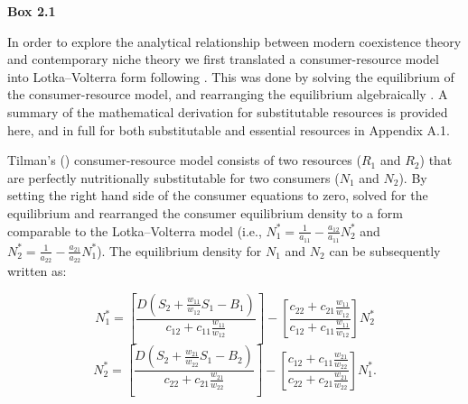 \clearpage 
\begin{flushleft}
\textbf{Box 2.1}
\end{flushleft}
\begin{infobox}
	
In order to explore the analytical relationship between modern coexistence theory \citep{Chesson2000} and contemporary niche theory \citep{Chase2003} we first translated a consumer-resource model into Lotka--Volterra form following \citet[][Ch.~7]{tilman1982}. This was done by solving the equilibrium of the consumer-resource model, and rearranging the equilibrium algebraically \citep[for an alternative approach see][]{Meszenaz2006, Barabas2014}. A summary of the mathematical derivation for substitutable resources is provided here, and in full for both substitutable and essential resources in Appendix A.1.
\par


Tilman's (\citeyear{tilman1982}) consumer-resource model consists of two resources ($R_{1}$ and $R_{2}$) that are perfectly nutritionally substitutable for two consumers ($N_{1}$ and $N_{2}$). By setting the right hand side of the consumer equations to zero, \citet{tilman1982} solved for the equilibrium and rearranged the consumer equilibrium density to a form comparable to the Lotka--Volterra model (i.e., $N_{1}^{*}=\frac{1}{a_{11}}-\frac{a_{12}}{a_{11}}N_{2}^{*}$ and $N_{2}^{*}=\frac{1}{a_{22}}-\frac{a_{21}}{a_{22}}N_{1}^{*}$). The equilibrium density for $N_{1}$ and $N_{2}$ can be subsequently written as:

\begin{equation}
N_1^* = \left[ {\frac{{D\left( {{S_2} + \frac{{{w_{11}}}}{{{w_{12}}}}{S_1} - {B_1}} \right)}}{{{c_{12}} + {c_{11}}\frac{{{w_{11}}}}{{{w_{12}}}}}}} \right] - \left[ {\frac{{{c_{22}} + {c_{21}}\frac{{{w_{11}}}}{{{w_{12}}}}}}{{{c_{12}} + {c_{11}}\frac{{{w_{11}}}}{{{w_{12}}}}}}} \right]N_2^*
\tag{2.4.1}\label{eq:2.4.1}
\end{equation}
\begin{equation}
N_2^* = \left[ {\frac{{D\left( {{S_2} + \frac{{{w_{21}}}}{{{w_{22}}}}{S_1} - {B_2}} \right)}}{{{c_{22}} + {c_{21}}\frac{{{w_{21}}}}{{{w_{22}}}}}}} \right] - \left[ {\frac{{{c_{12}} + {c_{11}}\frac{{{w_{21}}}}{{{w_{22}}}}}}{{{c_{22}} + {c_{21}}\frac{{{w_{21}}}}{{{w_{22}}}}}}} \right]N_1^*.
\tag{2.4.2}\label{eq:2.4.2}
\end{equation}


\end{infobox}
